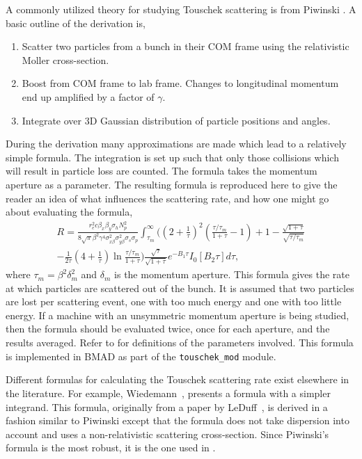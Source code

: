 A commonly utilized theory for studying Touschek scattering is from
Piwinski \cite{b:piwinski}.  A basic outline of the derivation is,
\begin{enumerate}
\item Scatter two particles from a bunch in their COM frame using the relativistic
Moller cross-section.
\item Boost from COM frame to lab frame.  Changes to longitudinal momentum end up 
amplified by a factor of $\gamma$.
\item Integrate over 3D Gaussian distribution of particle positions and angles.
\end{enumerate}
During the derivation many approximations are made which lead to a relatively simple
formula.  The integration is set up such that only those collisions which will
result in particle loss are counted.  The formula takes the momentum aperture
as a parameter.  The resulting formula is reproduced here to give the reader
an idea of what influences the scattering rate, and how one might go about evaluating
the formula,
\begin{multline}
R=\frac{r_e^2 c\beta_x\beta_y\sigma_h N_p^2}{8\sqrt\pi\beta^2\gamma^4\sigma_{x\beta}^2
\sigma_{y\beta}^2\sigma_s\sigma_p}\int_{\tau_m}^\infty\Bigg(
\left(2+\frac{1}{\tau}\right)^2\left(\frac{\tau/\tau_m}{1+\tau}-1\right)+1
-\frac{\sqrt{1+\tau}}{\sqrt{\tau/\tau_m}}\\
-\frac{1}{2\tau}\left(4+\frac{1}{\tau}\right)\ln\frac{\tau/\tau_m}{1+\tau}\Bigg)
\frac{\sqrt\tau}{\sqrt{1+\tau}}e^{-B_1\tau}I_0\left[B_2\tau\right]d\tau,
\end{multline}
where $\tau_m=\beta^2\delta_m^2$ and $\delta_m$ is the momentum
aperture.  This formula gives the rate at which particles are
scattered out of the bunch.  It is assumed that two particles are lost
per scattering event, one with too much energy and one with too little
energy.  If a machine with an unsymmetric momentum aperture is being
studied, then the formula should be evaluated twice, once for each
aperture, and the results averaged.  Refer to \cite{b:piwinski} for
definitions of the parameters involved.  This formula is implemented
in BMAD as part of the {\tt touschek\_mod} module.

Different formulas for calculating the Touschek scattering rate exist
elsewhere in the literature.  For example,
Wiedemann~\cite{b:wiedemann}, presents a formula with a simpler
integrand.  This formula, originally from a paper by
LeDuff~\cite{b:leduff}, is derived in a fashion similar to Piwinski
except that the formula does not take dispersion into account and uses
a non-relativistic scattering cross-section.  Since Piwinski's formula
is the most robust, it is the one used in \bmad.

